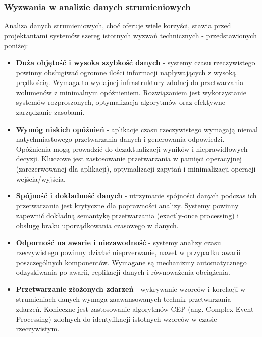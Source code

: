 \subsubsection{Wyzwania w analizie danych strumieniowych}
\label{subsubsec:wyzwania_analizy_rt}

Analiza danych strumieniowych, choć oferuje wiele korzyści, stawia przed projektantami systemów szereg istotnych wyzwań technicznych - przedstawionych poniżej:

\begin{itemize}
    \item \textbf{Duża objętość i wysoka szybkość danych} - systemy czasu rzeczywistego powinny obsługiwać ogromne ilości informacji napływających z wysoką prędkością. Wymaga to wydajnej infrastruktury zdolnej do przetwarzania wolumenów z minimalnym opóźnieniem. Rozwiązaniem jest wykorzystanie systemów rozproszonych, optymalizacja algorytmów oraz efektywne zarządzanie zasobami.
    
    \item \textbf{Wymóg niskich opóźnień} - aplikacje czasu rzeczywistego wymagają niemal natychmiastowego przetwarzania danych i generowania odpowiedzi. Opóźnienia mogą prowadzić do dezaktualizacji wyników i nieprawidłowych decyzji. Kluczowe jest zastosowanie przetwarzania w pamięci operacyjnej (zarezerwowanej dla aplikacji), optymalizacji zapytań i minimalizacji operacji wejścia/wyjścia.
    
    \item \textbf{Spójność i dokładność danych} - utrzymanie spójności danych podczas ich przetwarzania jest krytyczne dla poprawności analizy. Systemy powinny zapewnić dokładną semantykę przetwarzania (exactly-once processing) i obsługę braku uporządkowania czasowego w danych.
    
    \newpage

    \item \textbf{Odporność na awarie i niezawodność} - systemy analizy czasu rzeczywistego powinny działać nieprzerwanie, nawet w przypadku awarii poszczególnych komponentów. Wymagane są mechanizmy automatycznego odzyskiwania po awarii, replikacji danych i równoważenia obciążenia.
    
    \item \textbf{Przetwarzanie złożonych zdarzeń} - wykrywanie wzorców i korelacji w strumieniach danych wymaga zaawansowanych technik przetwarzania zdarzeń. Konieczne jest zastosowanie algorytmów CEP (ang. Complex Event Processing) \cite{luckham2002power} zdolnych do identyfikacji istotnych wzorców w czasie rzeczywistym.
    

\end{itemize}
